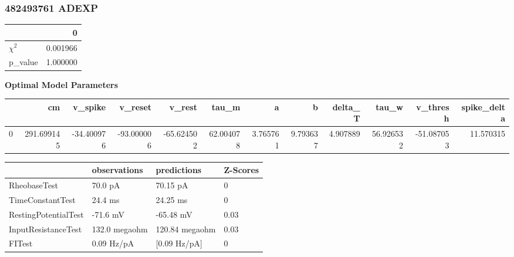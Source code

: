 \subsubsection{482493761 ADEXP}\begin{tabular}{lr}
\toprule
{} &         0 \\
\midrule
$\chi^{2}$ &  0.001966 \\
p\_value    &  1.000000 \\
\bottomrule
\end{tabular}
\textbf{Optimal Model Parameters} \begin{tabular}{lrrrrrrrrrrr}
\toprule
{} &          cm &    v\_spike &    v\_reset &     v\_rest &      tau\_m &         a &         b &   delta\_T &      tau\_w &   v\_thresh &  spike\_delta \\
\midrule
0 &  291.699145 & -34.400976 & -93.000006 & -65.624502 &  62.004078 &  3.765761 &  9.793637 &  4.907889 &  56.926532 & -51.087053 &    11.570315 \\
\bottomrule
\end{tabular}
\begin{tabular}{llll}
\toprule
{} &   observations &     predictions & Z-Scores \\
\midrule
RheobaseTest         &        70.0 pA &        70.15 pA &        0 \\
TimeConstantTest     &        24.4 ms &        24.25 ms &        0 \\
RestingPotentialTest &       -71.6 mV &       -65.48 mV &     0.03 \\
InputResistanceTest  &  132.0 megaohm &  120.84 megaohm &     0.03 \\
FITest               &     0.09 Hz/pA &    [0.09 Hz/pA] &        0 \\
\bottomrule
\end{tabular}
